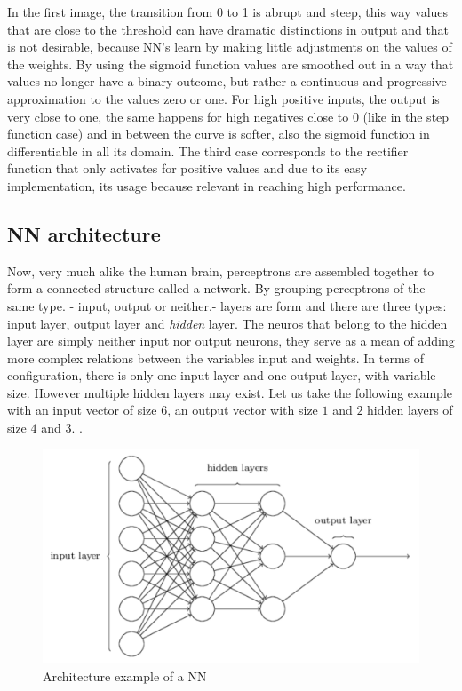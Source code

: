 In the first image, the transition from 0 to 1 is abrupt and steep, this way values that are close to the threshold can have dramatic distinctions in output and that is not desirable, because NN's learn by making little adjustments on the values of the weights. By using the sigmoid function values are smoothed out in a way that values no longer have a binary outcome, but rather a continuous and  progressive approximation to the values zero or one. For high positive inputs, the output is very close to one, the same happens for high negatives close to 0 (like in the step function case) and in between the curve is softer, also the sigmoid function in differentiable in all its domain. The third case corresponds to the rectifier function that only activates for positive values and due to its easy implementation, its usage because relevant in reaching high performance.

\subsection{NN architecture }

Now, very much alike the human brain, perceptrons are assembled together to form a connected structure called a network. By grouping perceptrons of the same type. - input, output or neither.- layers are form and there are three types: input layer, output layer and \textit{hidden} layer. The neuros that belong to the hidden layer are simply neither input nor output neurons, they serve as a mean of adding more complex relations between the variables input and weights. In terms of configuration, there is only one input layer and one output layer, with variable size. However multiple hidden layers may exist. Let us take the following example with an input vector of size $6$, an output vector with size $1$ and $2$ hidden layers of size $4$ and $3$. \cite{nielsenneural}.


\begin{figure}[H]
	\centering
	\includegraphics[scale=0.5, width=0.65\linewidth]{figures/nnarch.png}
	\caption{Architecture example of a NN \cite{nielsenneural}}
	\label{nnarch}
\end{figure} 

